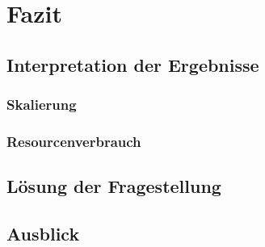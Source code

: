 \chapter{Fazit}

\section{Interpretation der Ergebnisse}

\subsection{Skalierung}
\subsection{Resourcenverbrauch}

\section{Lösung der Fragestellung}


\section{Ausblick}

